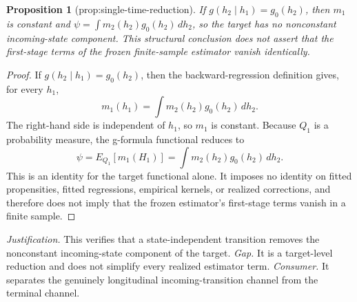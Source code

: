 \documentclass{article}
\newtheorem{proposition}{Proposition}
\begin{document}
\begin{proposition}[prop:single-time-reduction]\label{prop:single-time-reduction}
If \(g(h_2\mid h_1)=g_0(h_2)\), then \(m_1\) is constant and \(\psi=\int m_2(h_2)g_0(h_2)\,dh_2\), so the target has no nonconstant incoming-state component. This structural conclusion does not assert that the first-stage terms of the frozen finite-sample estimator vanish identically.
\end{proposition}
\begin{proof}
If \(g(h_2\mid h_1)=g_0(h_2)\), then the backward-regression definition gives, for every \(h_1\),
\[m_1(h_1)=\int m_2(h_2)g_0(h_2)\,dh_2.\]
The right-hand side is independent of \(h_1\), so \(m_1\) is constant. Because \(Q_1\) is a probability measure, the g-formula functional reduces to
\[\psi=E_{Q_1}[m_1(H_1)]=\int m_2(h_2)g_0(h_2)\,dh_2.\]
This is an identity for the target functional alone. It imposes no identity on fitted propensities, fitted regressions, empirical kernels, or realized corrections, and therefore does not imply that the frozen estimator's first-stage terms vanish in a finite sample.
\end{proof}
\par\smallskip\noindent \textit{Justification.} This verifies that a state-independent transition removes the nonconstant incoming-state component of the target. \textit{Gap.} It is a target-level reduction and does not simplify every realized estimator term. \textit{Consumer.} It separates the genuinely longitudinal incoming-transition channel from the terminal channel.
\end{document}

